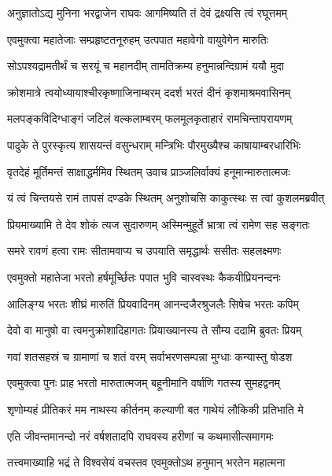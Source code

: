 \twolineshloka
{अनुज्ञातोऽद्य मुनिना भरद्वाजेन राघवः}
{आगमिष्यति तं देवं द्रक्ष्यसि त्वं रघूत्तमम्} %

\twolineshloka
{एवमुक्त्वा महातेजाः सम्प्रहृष्टतनूरुहम्}
{उत्पपात महावेगो वायुवेगेन मारुतिः} %

\twolineshloka
{सोऽपश्यद्रामतीर्थं च सरयूं च महानदीम्}
{तामतिक्रम्य हनुमान्नन्दिग्रामं ययौ मुदा} %

\twolineshloka
{क्रोशमात्रे त्वयोध्यायाश्चीरकृष्णाजिनाम्बरम्}
{ददर्श भरतं दीनं कृशमाश्रमवासिनम्} %

\twolineshloka
{मलपङ्कविदिग्धाङ्गं जटिलं वल्कलाम्बरम्}
{फलमूलकृताहारं रामचिन्तापरायणम्} %

\twolineshloka
{पादुके ते पुरस्कृत्य शासयन्तं वसुन्धराम्}
{मन्त्रिभिः पौरमुख्यैश्च काषायाम्बरधारिभिः} %

\twolineshloka
{वृतदेहं मूर्तिमन्तं साक्षाद्धर्ममिव स्थितम्}
{उवाच प्राञ्जलिर्वाक्यं हनूमान्मारुतात्मजः} %

\twolineshloka
{यं त्वं चिन्तयसे रामं तापसं दण्डके स्थितम्}
{अनुशोचसि काकुत्स्थः स त्वां कुशलमब्रवीत्} %

\twolineshloka
{प्रियमाख्यामि ते देव शोकं त्यज सुदारुणम्}
{अस्मिन्मुहूर्ते भ्रात्रा त्वं रामेण सह सङ्गतः} %

\twolineshloka
{समरे रावणं हत्वा रामः सीतामवाप्य च}
{उपयाति समृद्धार्थः ससीतः सहलक्ष्मणः} %

\twolineshloka
{एवमुक्तो महातेजा भरतो हर्षमूर्च्छितः}
{पपात भुवि चास्वस्थः कैकयीप्रियनन्दनः} %

\twolineshloka
{आलिङ्ग्य भरतः शीघ्रं मारुतिं प्रियवादिनम्}
{आनन्दजैरश्रुजलैः सिषेच भरतः कपिम्} %

\twolineshloka
{देवो वा मानुषो वा त्वमनुक्रोशादिहागतः}
{प्रियाख्यानस्य ते सौम्य ददामि ब्रुवतः प्रियम्} %

\twolineshloka
{गवां शतसहस्रं च ग्रामाणां च शतं वरम्}
{सर्वाभरणसम्पन्ना मुग्धाः कन्यास्तु षोडश} %

\twolineshloka
{एवमुक्त्वा पुनः प्राह भरतो मारुतात्मजम्}
{बहूनीमानि वर्षाणि गतस्य सुमहद्वनम्} %

\twolineshloka
{शृणोम्यहं प्रीतिकरं मम नाथस्य कीर्तनम्}
{कल्याणी बत गाथेयं लौकिकी प्रतिभाति मे} %

\twolineshloka
{एति जीवन्तमानन्दो नरं वर्षशतादपि}
{राघवस्य हरीणां च कथमासीत्समागमः} %

\twolineshloka
{तत्त्वमाख्याहि भद्रं ते विश्वसेयं वचस्तव}
{एवमुक्तोऽथ हनुमान् भरतेन महात्मना} %

